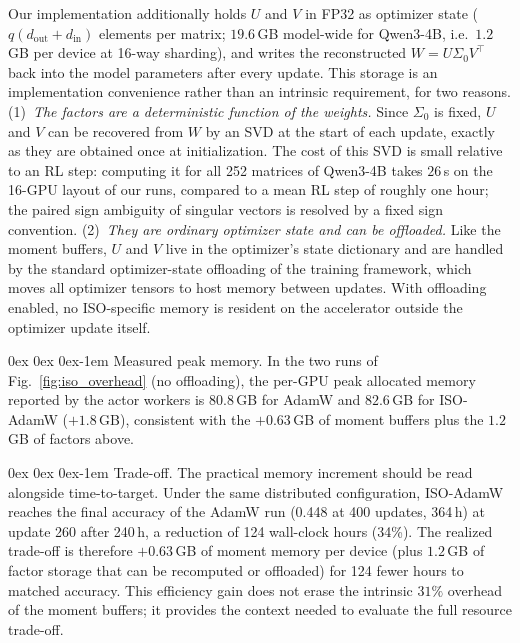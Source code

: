 \documentclass[11pt, a4paper]{utda}
\makeatletter
\renewcommand{\paragraph}{%
  \@startsection{paragraph}{4}%
  {\z@}{0ex \@plus 0ex \@minus 0ex}{-1em}%
  {\normalfont\normalsize\bfseries}%
}
\theoremstyle{plain}
\theoremstyle{definition}
\theoremstyle{remark}
\makeatother
\begin{document}
Our implementation additionally holds $U$ and $V$ in FP32 as optimizer state ($q(d_{\mathrm{out}}+d_{\mathrm{in}})$
elements per matrix; $19.6$\,GB model-wide for Qwen3-4B, i.e.\ $1.2$\,GB per device at 16-way sharding), and
writes the reconstructed $W=U\Sigma_0 V^\top$ back into the model parameters after every update. This storage is
an implementation convenience rather than an intrinsic requirement, for two reasons.
(1)~\emph{The factors are a deterministic function of the weights.} Since $\Sigma_0$ is fixed, $U$ and $V$ can be
recovered from $W$ by an SVD at the start of each update, exactly as they are obtained once at initialization.
The cost
of this SVD is small relative to an RL step: computing it for all 252 matrices of Qwen3-4B takes
$26$\,s on the 16-GPU layout of our runs, compared to a mean RL step of roughly one hour; the paired sign
ambiguity of singular vectors is resolved by a fixed sign convention.
(2)~\emph{They are ordinary optimizer state and can be offloaded.} Like the moment buffers, $U$ and $V$ live in
the optimizer's state dictionary and are handled by the standard optimizer-state offloading of the training
framework, which moves all optimizer tensors to host memory between updates. With offloading enabled, no ISO-specific memory is resident on the accelerator outside the optimizer update itself.

\paragraph{Measured peak memory.}
In the two runs of Fig.~\ref{fig:iso_overhead} (no offloading), the per-GPU peak
 allocated memory reported by
the actor workers is $80.8$\,GB for AdamW and $82.6$\,GB for ISO-AdamW ($+1.8$\,GB), consistent with the
$+0.63$\,GB of moment buffers plus the $1.2$\,GB of factors above.

\paragraph{Trade-off.}
The practical memory increment should be read alongside time-to-target. Under the same distributed
configuration, ISO-AdamW reaches the final accuracy of the AdamW run (0.448 at 400 updates, 364\,h) at
update 260 after 240\,h, a reduction of 124 wall-clock hours (34\%). The realized trade-off is therefore
$+0.63$\,GB of moment memory per device (plus $1.2$\,GB of factor storage that can be recomputed or
offloaded) for 124 fewer hours to matched accuracy. This efficiency gain does not erase the intrinsic $31\%$ overhead of the moment buffers; it provides the context needed to evaluate the full resource trade-off.
\end{document}
